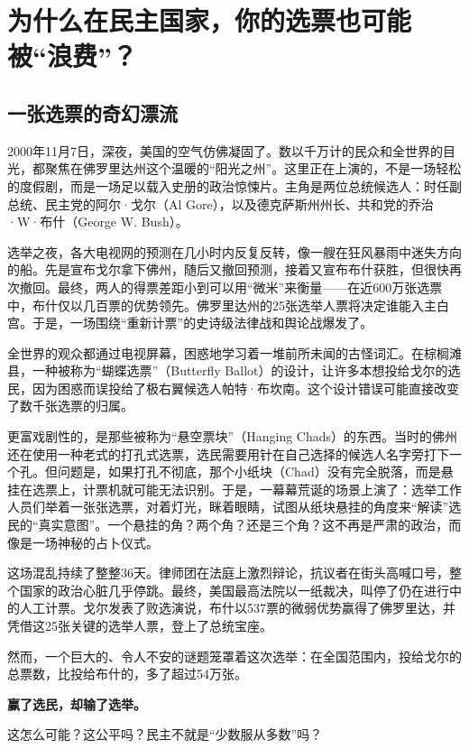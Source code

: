 \chapter{为什么在民主国家，你的选票也可能被“浪费”？}

\section{一张选票的奇幻漂流}

2000年11月7日，深夜，美国的空气仿佛凝固了。数以千万计的民众和全世界的目光，都聚焦在佛罗里达州这个温暖的“阳光之州”。这里正在上演的，不是一场轻松的度假剧，而是一场足以载入史册的政治惊悚片。主角是两位总统候选人：时任副总统、民主党的阿尔·戈尔（Al Gore），以及德克萨斯州州长、共和党的乔治·W·布什（George W. Bush）。

选举之夜，各大电视网的预测在几小时内反复反转，像一艘在狂风暴雨中迷失方向的船。先是宣布戈尔拿下佛州，随后又撤回预测，接着又宣布布什获胜，但很快再次撤回。最终，两人的得票差距小到可以用“微米”来衡量——在近600万张选票中，布什仅以几百票的优势领先。佛罗里达州的25张选举人票将决定谁能入主白宫。于是，一场围绕“重新计票”的史诗级法律战和舆论战爆发了。

全世界的观众都通过电视屏幕，困惑地学习着一堆前所未闻的古怪词汇。在棕榈滩县，一种被称为“蝴蝶选票”（Butterfly Ballot）的设计，让许多本想投给戈尔的选民，因为困惑而误投给了极右翼候选人帕特·布坎南。这个设计错误可能直接改变了数千张选票的归属。

更富戏剧性的，是那些被称为“悬空票块”（Hanging Chads）的东西。当时的佛州还在使用一种老式的打孔式选票，选民需要用针在自己选择的候选人名字旁打下一个孔。但问题是，如果打孔不彻底，那个小纸块（Chad）没有完全脱落，而是悬挂在选票上，计票机就可能无法识别。于是，一幕幕荒诞的场景上演了：选举工作人员们举着一张张选票，对着灯光，眯着眼睛，试图从纸块悬挂的角度来“解读”选民的“真实意图”。一个悬挂的角？两个角？还是三个角？这不再是严肃的政治，而像是一场神秘的占卜仪式。

这场混乱持续了整整36天。律师团在法庭上激烈辩论，抗议者在街头高喊口号，整个国家的政治心脏几乎停跳。最终，美国最高法院以一纸裁决，叫停了仍在进行中的人工计票。戈尔发表了败选演说，布什以537票的微弱优势赢得了佛罗里达，并凭借这25张关键的选举人票，登上了总统宝座。

然而，一个巨大的、令人不安的谜题笼罩着这次选举：在全国范围内，投给戈尔的总票数，比投给布什的，多了超过54万张。

\textbf{赢了选民，却输了选举。}

这怎么可能？这公平吗？民主不就是“少数服从多数”吗？

